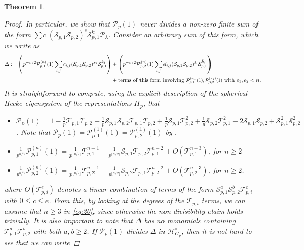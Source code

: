 \documentclass{amsart}%
\theoremstyle{plain}
\newtheorem{thm}{Theorem}[subsection]
\newcommand\scalemath[2]{\scalebox{#1}{\mbox{\ensuremath{\displaystyle #2}}}}
\theoremstyle{plain}
\theoremstyle{remark}
\begin{document}
\begin{thm}
\begin{proof}
        In particular, we show that $\mathcal{P}_p(1)$ never divides a non-zero finite sum of the form $\sum c\ (\mathcal{S}_{p,1}\mathcal{S}_{p,2})^s\mathcal{S}_{p,1}^k \mathscr{P}_\lambda$. Consider an arbitrary sum of this form, which we write as 
        \begin{align}\label{eq:20}\Delta:=\left(p^{-n/2}\mathcal{P}_{p,1}^{(n)}(1)\sum_{i,j}c_{i,j}(\mathcal{S}_{p,1}\mathcal{S}_{p,2})^{s_i}\mathcal{S}_{p,1}^{k_j}\right)&+\left(p^{-n/2}\mathcal{P}_{p,2}^{(n)}(1)\sum_{i,j}d_{i,j}(\mathcal{S}_{p,1}\mathcal{S}_{p,2})^{\tilde{s}_i}\mathcal{S}_{p,1}^{\tilde{k}_j}\right)\\
        &+ \text{terms of this form involving }  \scalemath{0.9}{\mathcal{P}_{p,1}^{(e_1)}(1),\mathcal{P}_{p,2}^{(e_2)}(1)}\text{ with }  e_1,e_2<n.
        \end{align}
It is straightforward to compute, using the explicit description of the spherical Hecke eigensystem of the representations $\Pi_p$, that
        \begin{itemize}
            \item $\mathcal{P}_p(1)=1-\frac{1}{p}\mathcal{T}_{p,1}\mathcal{T}_{p,2}-\frac{1}{p}\mathcal{S}_{p,1}\mathcal{S}_{p,2}\mathcal{T}_{p,1}\mathcal{T}_{p,2}+\frac{1}{p}\mathcal{S}_{p,1}\mathcal{T}_{p,2}^2+\frac{1}{p}\mathcal{S}_{p,2}\mathcal{T}_{p,1}^2-2\mathcal{S}_{p,1}\mathcal{S}_{p,2}+\mathcal{S}_{p,1}^2\mathcal{S}_{p,2}^2$. Note that $\mathcal{P}_p(1)=\mathcal{P}_{p,1}^{(1)}(1)=\mathcal{P}_{p,2}^{(1)}(1)$ by .
            \item $\frac{1}{p^{n/2}}\mathcal{P}_{p,1}^{(n)}(1)=\frac{1}{p^{\lfloor n/2 \rfloor}}\mathcal{T}_{p,1}^{n-1}-\frac{1}{p^{\lfloor n/2 \rfloor}}\mathcal{S}_{p,1}\mathcal{T}_{p,2}\mathcal{T}_{p,1}^{n-2}+O(\mathcal{T}_{p,1}^{n-3})$, for $n\geq 2$ 
            \item $\frac{1}{p^{n/2}}\mathcal{P}_{p,2}^{(n)}(1)=\frac{1}{p^{\lfloor n/2 \rfloor}}\mathcal{T}_{p,2}^{n-1}-\frac{1}{p^{\lfloor n/2 \rfloor}}\mathcal{S}_{p,2}\mathcal{T}_{p,1}\mathcal{T}_{p,2}^{n-2}+O(\mathcal{T}_{p,2}^{n-3})$, for $n\geq 2$.
        \end{itemize}
        where $O(\mathcal{T}_{p,i}^{e})$ denotes a linear combination of terms of the form $\mathcal{S}_{p,1}^a\mathcal{S}_{p,2}^b\mathcal{T}_{p,i}^c$ with $0\leq c\leq e$.
        From this, by looking at the degrees of the $\mathcal{T}_{p,i}$ terms, we can assume that $n\geq 3$ in \eqref{eq:20}, since otherwise the non-divisibility claim holds trivially. It is also important to note that $\Delta$ has no monomials containing $\mathcal{T}_{p,1}^a\mathcal{T}_{p,2}^b$ with both $a,b\geq 2$. If $\mathcal{P}_p(1)$ divides $\Delta$ in $\mathcal{H}_{G_p}^\circ$, then it is not hard to see that we can write 

\end{proof}
\end{thm}
\end{document}
